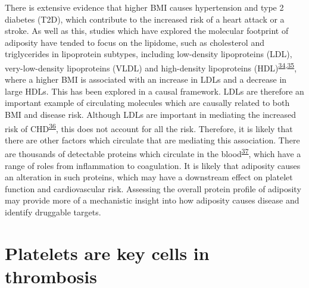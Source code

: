 \documentclass[11pt,twoside]{bristolthesis}
\begin{document}
There is extensive evidence that higher BMI causes hypertension and type 2 diabetes (T2D), which contribute to the increased risk of a heart attack or a stroke. As well as this, studies which have explored the molecular footprint of adiposity have tended to focus on the lipidome, such as cholesterol and triglycerides in lipoprotein subtypes, including low-density lipoproteins (LDL), very-low-density lipoproteins (VLDL) and high-density lipoproteins (HDL)\textsuperscript{\protect\hyperlink{ref-Bell2018a}{34},\protect\hyperlink{ref-Wurtz2014}{35}}, where a higher BMI is associated with an increase in LDLs and a decrease in large HDLs. This has been explored in a causal framework. LDLs are therefore an important example of circulating molecules which are causally related to both BMI and disease risk. Although LDLs are important in mediating the increased risk of CHD\textsuperscript{\protect\hyperlink{ref-Lu2014}{36}}, this does not account for all the risk. Therefore, it is likely that there are other factors which circulate that are mediating this association. There are thousands of detectable proteins which circulate in the blood\textsuperscript{\protect\hyperlink{ref-Sun2018}{37}}, which have a range of roles from inflammation to coagulation. It is likely that adiposity causes an alteration in such proteins, which may have a downstream effect on platelet function and cardiovascular risk. Assessing the overall protein profile of adiposity may provide more of a mechanistic insight into how adiposity causes disease and identify druggable targets.

\hypertarget{platelets-are-key-cells-in-thrombosis}{%
\section{Platelets are key cells in thrombosis}\label{platelets-are-key-cells-in-thrombosis}}
\end{document}
